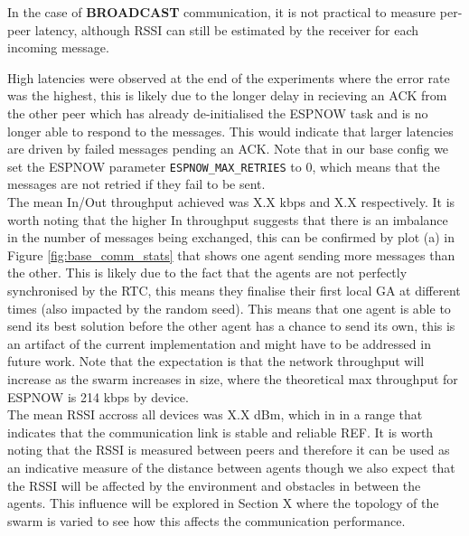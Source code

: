 \documentclass[conference]{IEEEtran}
\begin{document}
In the case of \textbf{BROADCAST} communication, it is not practical to measure per-peer latency, although RSSI can still be estimated by the receiver for each incoming message.

High latencies were observed at the end of the experiments where the error rate was the highest, this is likely due to the longer delay in recieving an ACK from the other peer which has already de-initialised the ESPNOW task and is no longer able to respond to the messages. This would indicate that larger latencies are driven by failed messages pending an ACK. Note that in our base config we set the ESPNOW parameter \texttt{ESPNOW\_MAX\_RETRIES} to 0, which means that the messages are not retried if they fail to be sent.\\

The mean In/Out throughput achieved was X.X kbps and X.X respectively. It is worth noting that the higher In throughput suggests that there is an imbalance in the number of messages being exchanged, this can be confirmed by plot (a) in Figure \ref{fig:base_comm_stats} that shows one agent sending more messages than the other. This is likely due to the fact that the agents are not perfectly synchronised by the RTC, this means they finalise their first local GA at different times (also impacted by the random seed). This means that one agent is able to send its best solution before the other agent has a chance to send its own, this is an artifact of the current implementation and might have to be addressed in future work. Note that the expectation is that the network throughput will increase as the swarm increases in size, where the theoretical max throughput for ESPNOW is 214 kbps by device.\\ 

The mean RSSI accross all devices was X.X dBm, which in in a range that indicates that the communication link is stable and reliable REF. It is worth noting that the RSSI is measured between peers and therefore it can be used as an indicative measure of the distance between agents though we also expect that the RSSI will be affected by the environment and obstacles in between the agents. This influence will be explored in Section X where the topology of the swarm is varied to see how this affects the communication performance.\\

\newpage
\printbibliography
\end{document}
